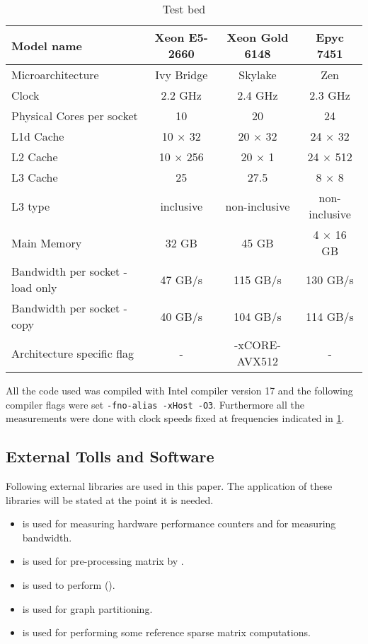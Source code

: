 \begin{table}[tbhp]
\footnotesize
\caption{Test bed}\label{tab:test_bed}
\begin{center}
	\begin{tabular}{|l| c  c c |}
		\toprule
		{Model name} & {Xeon\textsuperscript{\textregistered} E5-2660} & {Xeon\textsuperscript{\textregistered} Gold 6148} & { Epyc 7451 } \\
		\midrule
		{Microarchitecture} & {Ivy Bridge} & {Skylake} & {Zen} \\
		\midrule
		{Clock} & {2.2 GHz} & {2.4 GHz} & {2.3 GHz}\\
		{Physical Cores per socket} & {10} & {20} & {24}\\
		{L1d Cache} & {10 $\times$ 32 \KB} & {20 $\times$ 32 \KB} & {24 $\times$  32 \KB}\\
		{L2 Cache} & {10 $\times$ 256 \KB} & {20 $\times$ 1 \MB} & {24 $\times$ 512 \MB }\\
		{L3 Cache} & {25 \MB} & {27.5 \MB} & {8 $\times$ 8 \MB}\\
		{L3 type} & {inclusive} & {non-inclusive} & {non-inclusive}\\
		{Main Memory} & {32 GB} & {45 GB} & {4 $\times$ 16 GB}\\
		{Bandwidth per socket - load only} & {47 GB/s} & {115 GB/s} & {130 GB/s }\\ %
		{Bandwidth per socket - copy} & {40 GB/s} & {104 GB/s} & {114 GB/s }\\
		{Architecture specific flag} & {-} & {-xCORE-AVX512} & {-}\\
		\bottomrule
	\end{tabular}
\end{center}
\end{table} 

All the code used was compiled with Intel compiler version 17 and the following compiler flags were set {\tt -fno-alias -xHost -O3}. Furthermore all the measurements were done with  \CPU clock speeds fixed at frequencies indicated in \cref{tab:test_bed}.


\subsection{External Tolls and Software}
Following external libraries are used in this paper. The application of these libraries will be stated at the point it is needed.
\begin{itemize}
	\item \LIKWID \cite{LIKWID}  is used for measuring hardware performance counters and   for measuring bandwidth.
	\item \COLPACK \cite{COLPACK} is used for pre-processing matrix by \MCfull.
	\item \SPMP \cite{SpMP} is used to perform \RCMfull (\RCM).
	\item \METIS\cite{METIS} is used for graph partitioning.
	\item \MKL \cite{MKL} is used for performing some reference sparse matrix computations.
\end{itemize}

